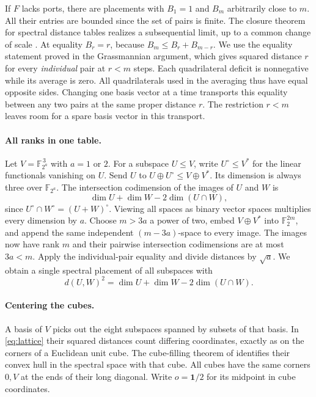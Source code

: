 \documentclass[11pt]{article}
\theoremstyle{definition}
\newcommand{\F}{\mathbb F}
\newcommand{\one}{\mathbf 1}
\begin{document}
If \(F\) lacks ports, there are placements with \(B_1=1\) and \(B_m\)
arbitrarily close to \(m\). All their entries are bounded since the set
of pairs is finite. The closure theorem for spectral distance tables
realizes a subsequential limit, up to a common change of scale
\cite{euclid}. At equality \(B_r=r\), because
\(B_m\le B_r+B_{m-r}\). We use the equality statement proved in the
Grassmannian argument, which gives squared distance \(r\) for every
\emph{individual} pair at \(r<m\) steps. Each quadrilateral deficit is
nonnegative while its average is zero. All quadrilaterals used in the
averaging thus have equal opposite sides. Changing one basis vector at
a time transports this equality between any two pairs at the same
proper distance \(r\). The restriction \(r<m\) leaves room for a spare
basis vector in this transport.

\paragraph{All ranks in one table.}
Let \(V=\F_{2^a}^{\,3}\) with \(a=1\) or \(2\). For a subspace \(U\le V\),
write \(U^\circ\le V^*\) for the linear functionals vanishing on \(U\).
Send \(U\) to \(U\oplus U^\circ\le V\oplus V^*\). Its dimension is
always three over \(\F_{2^a}\). The intersection codimension of the images
of \(U\) and \(W\) is
\[
          \dim U+\dim W-2\dim(U\cap W),
\]
since \(U^\circ\cap W^\circ=(U+W)^\circ\). Viewing all spaces as binary
vector spaces multiplies every dimension by \(a\). Choose \(m>3a\) a
power of two, embed \(V\oplus V^*\) into \(\F_2^{2m}\), and append the same
independent \((m-3a)\)-space to every image. The images now have rank
\(m\) and their pairwise intersection codimensions are at most \(3a<m\).
Apply the individual-pair equality and divide distances by \(\sqrt a\).
We obtain a single spectral placement of all subspaces with
\begin{equation}
                 d(U,W)^2=\dim U+\dim W-2\dim(U\cap W).
                 \label{eq:lattice}
\end{equation}

\paragraph{Centering the cubes.}
A basis of \(V\) picks out the eight subspaces spanned by subsets of that
basis. In \eqref{eq:lattice} their squared distances count differing
coordinates, exactly as on the corners of a Euclidean unit cube. The
cube-filling theorem of \cite{euclid} identifies their convex hull in
the spectral space with that cube. All cubes have the same corners \(0,V\)
at the ends of their long diagonal. Write \(o=\one/2\) for its midpoint
in cube coordinates.
\end{document}
